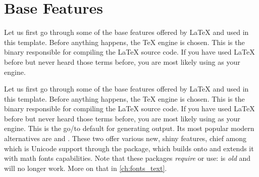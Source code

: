 \chapter{Base Features}
\label{ch:base-features}
\begin{chapterabstract}
    Let us first go through some of the base features offered by \LaTeX{} and used in
this template.
Before anything happens, the \TeX{} engine is chosen.
This is the binary responsible for compiling the \LaTeX{} source code.
If you have used \LaTeX{} before but never heard those terms before, you are most
likely using  as your engine.
\end{chapterabstract}
\chaptertoc

Let us first go through some of the base features offered by \LaTeX{} and used in
this template.
Before anything happens, the \TeX{} engine is chosen.
This is the binary responsible for compiling the \LaTeX{} source code.
If you have used \LaTeX{} before but never heard those terms before, you are most
likely using  as your engine.
This is the go\-/to default for generating  output.
Its most popular modern alternatives are  and .
These two offer various new, shiny features, chief among which is Unicode
support through the  package, which builds onto
 and extends it with math fonts capabilities.
Note that these packages \emph{require}  or  use:
 is \emph{old} and will no longer work.
More on that in \cref{ch:fonts_text}.


